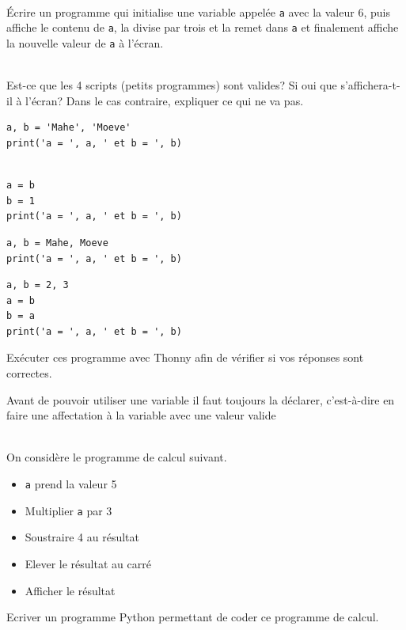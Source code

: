 \documentclass[a4paper,12pt]{article}
\begin{document}
\exo{}  ~\\ 
 Écrire un programme qui initialise une variable appelée \lstinline{a} avec la valeur 6, puis affiche le contenu de \lstinline{a}, la divise par trois et la remet dans \lstinline{a} et finalement affiche la nouvelle valeur de \lstinline{a} à l'écran.

\finexo

\newpage
\exo{}  ~\\ 
 Est-ce que les 4 scripts (petits programmes) sont valides? Si oui que s’affichera-t-il à l’écran? Dans le cas contraire, expliquer ce qui ne va pas.  
\begin{multicols}{2}
	\begin{lstlisting}[numbers=none]
a, b = 'Mahe', 'Moeve'
print('a = ', a, ' et b = ', b)
	\end{lstlisting}
	\begin{lstlisting}[numbers=none]
		
a = b
b = 1
print('a = ', a, ' et b = ', b)
	\end{lstlisting}
	\begin{lstlisting}[numbers=none]
a, b = Mahe, Moeve
print('a = ', a, ' et b = ', b)
	\end{lstlisting}
	\begin{lstlisting}[numbers=none]
a, b = 2, 3
a = b
b = a
print('a = ', a, ' et b = ', b)
	\end{lstlisting}
\end{multicols}
\vspace{-5mm}
Exécuter ces programme avec Thonny afin de vérifier si vos réponses sont correctes.

\begin{important}
	Avant de pouvoir utiliser une variable il faut toujours la déclarer, c'est-à-dire en \py faire une affectation à la variable avec une valeur valide
\end{important}

\finexo

\exo{}  ~\\ 
 On considère le programme de calcul suivant.
\begin{itemize}
	\item \lstinline{a} prend la valeur 5
	\item  Multiplier \lstinline{a}  par 3
	\item Soustraire 4 au résultat
	\item Elever le résultat au carré
	\item Afficher le résultat
\end{itemize}
Ecriver un programme Python permettant de coder ce programme de calcul.
\begin{correction}
	~\\ 
	
\end{correction}
\finexo
\end{document}
